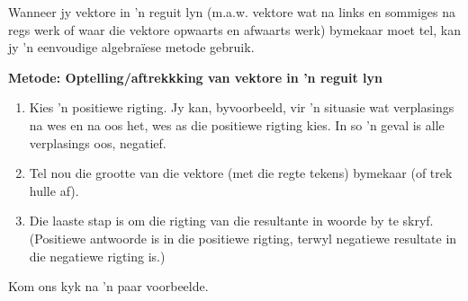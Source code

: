 Wanneer jy vektore in  'n reguit lyn (m.a.w. vektore wat na links en sommiges na regs werk of waar die vektore opwaarts en afwaarts werk) bymekaar moet tel, kan jy  'n eenvoudige algebraïese metode gebruik.\\

\begin{minipage}{\textwidth}
\textbf{Metode: Optelling/aftrekkking van vektore in  'n reguit lyn}
\begin{enumerate}[noitemsep, label=\textbf{\arabic*}.]
\item{Kies  'n positiewe rigting. Jy kan, byvoorbeeld, vir  'n situasie wat verplasings na wes en na oos het, wes as die positiewe rigting kies. In so  'n geval is alle verplasings oos, negatief.}
\item{Tel nou die grootte van die vektore (met die regte tekens) bymekaar (of trek hulle af).}
\item{Die laaste stap is om die rigting van die resultante in woorde by te skryf. (Positiewe antwoorde is in die positiewe rigting, terwyl negatiewe resultate in die negatiewe rigting is.)}\\
\end{enumerate}
\end{minipage}

Kom ons kyk na  'n paar voorbeelde.

